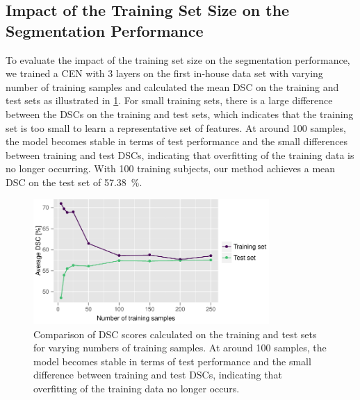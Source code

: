 \subsection[Impact of the training set size on the segmentation
performance]{Impact of the Training Set Size on the Segmentation Performance}

To evaluate the impact of the training set size on the segmentation performance,
we trained a CEN with 3 layers on the first in-house data set with varying
number of training samples and calculated the mean DSC on the training and test
sets as illustrated in \ref{fig:bioms}. For small training sets, there is a
large difference between the DSCs on the training and test sets, which indicates
that the training set is too small to learn a representative set of features. At
around 100 samples, the model becomes stable in terms of test performance and
the small differences between training and test DSCs, indicating that
overfitting of the training data is no longer occurring. With 100 training
subjects, our method achieves a mean DSC on the test set of
\SI{57.38}{\percent}.


\begin{figure}[tb]
\centering
\includegraphics[width=0.8\textwidth]{figures/train_count}
\caption[Comparison of DSC scores calculated on the training and test sets for
varying numbers of training samples]{Comparison of DSC scores calculated on the
training and test sets for varying numbers of training samples. At around 100
samples, the model becomes stable in terms of test performance and the small
difference between training and test DSCs, indicating that overfitting of the
training data no longer occurs.}
\label{fig:bioms}
\end{figure}

